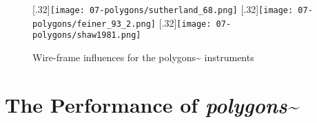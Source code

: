 \begin{figure}
    \centering
    \captionsetup{justification=centering}
    [.32\linewidth]{\texttt{[image: 07-polygons/sutherland\_68.png]}}\label{fig: sutherland1968_in8}
    \hfill
    [.32\linewidth]{\texttt{[image: 07-polygons/feiner\_93\_2.png]}}\label{fig: feiner93_in8}
    \hfill
    [.32\linewidth]{\texttt{[image: 07-polygons/shaw1981.png]}}\label{fig: shaw1981}
    \caption{Wire-frame influences for the polygons\textasciitilde{} instruments}
    \label{fig: polygons-wireframes}
\end{figure}


\section{The Performance of \textit{polygons\textasciitilde{}}}\label{sec: polygons-performances}

